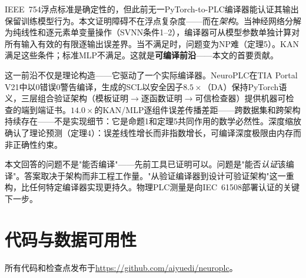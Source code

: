 \documentclass[journal,onecolumn]{IEEEtran}
\newcommand{\neuroplc}{NeuroPLC\xspace}
\theoremstyle{definition}
\theoremstyle{plain}
\theoremstyle{remark}
\begin{document}
IEEE~754浮点标准是确定性的，但此前无一PyTorch-to-PLC编译器能认证其输出保留训练模型行为。本文证明障碍不在浮点复杂度——而在\textit{架构}。当神经网络分解为纯线性和逐元素单变量操作（SVNN条件1--2），编译器可从模型参数单独计算对所有输入有效的有限逐输出误差界。当不满足时，问题变为NP难（定理5）。KAN满足这些条件；标准MLP不满足。这就是\textbf{可编译前沿}——本文的首要贡献。

这一前沿不仅是理论构造——它驱动了一个实际编译器。\neuroplc{}在TIA Portal V21中以0错误0警告编译，生成的SCL以安全因子$8.5\times$（DA）保持PyTorch语义，三层组合验证架构（模板证明$\to$逐函数证明$\to$可信检查器）提供机器可检查的端到端证书。$14.0\times$的KAN/MLP逐组件误差传播差距——跨数据集和跨架构持续存在——不是实现细节：它是命题1和定理5共同作用的数学必然性。深度缩放确认了理论预测（定理4）：误差线性增长而非指数增长，可编译深度极限由内存而非正确性约束。

本文回答的问题不是"能否编译"——先前工具已证明可以。问题是"能否\textit{认证}该编译"。答案取决于架构而非工程工作量。"从验证编译器到设计可验证架构"这一重构，比任何特定编译器实现更持久。物理PLC测量是向IEC~61508部署认证的关键下一步。

\section*{代码与数据可用性}
所有代码和检查点发布于\url{https://github.com/aiyuedi/neuroplc}。



\end{document}

